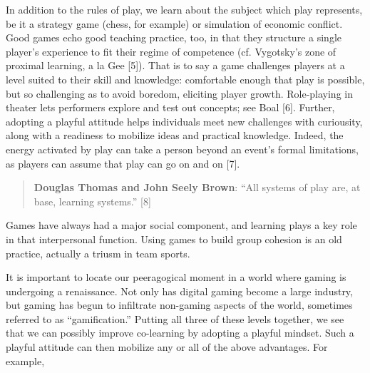 In addition to the rules of play, we learn about the subject which play
represents, be it a strategy game (chess, for example) or simulation of
economic conflict. Good games echo good teaching practice, too, in that
they structure a single player's experience to fit their regime of
competence (cf. Vygotsky's zone of proximal learning, a la Gee {[}5{]}).
That is to say a game challenges players at a level suited to their
skill and knowledge: comfortable enough that play is possible, but so
challenging as to avoid boredom, eliciting player growth. Role-playing
in theater lets performers explore and test out concepts; see Boal
{[}6{]}. Further, adopting a playful attitude helps individuals meet new
challenges with curiousity, along with a readiness to mobilize ideas and
practical knowledge. Indeed, the energy activated by play can take a
person beyond an event's formal limitations, as players can assume that
play can go on and on {[}7{]}.

\begin{quote}
\textbf{Douglas Thomas and John Seely Brown}: ``All systems of play are,
at base, learning systems.'' {[}8{]}
\end{quote}

Games have always had a major social component, and learning plays a key
role in that interpersonal function. Using games to build group cohesion
is an old practice, actually a triusm in team sports.

It is important to locate our peeragogical moment in a world where
gaming is undergoing a renaissance. Not only has digital gaming become a
large industry, but gaming has begun to infiltrate non-gaming aspects of
the world, sometimes referred to as ``gamification.'' Putting all three
of these levels together, we see that we can possibly improve
co-learning by adopting a playful mindset. Such a playful attitude can
then mobilize any or all of the above advantages. For example,

